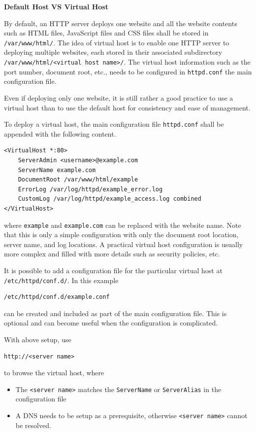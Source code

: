 \begin{mdframed}
	\noindent \textbf{Default Host VS Virtual Host}
	
	By default, an HTTP server deploys one website and all the website contents such as HTML files, JavaScript files and CSS files shall be stored in \verb|/var/www/html/|. The idea of virtual host is to enable one HTTP server to deploying multiple websites, each stored in their associated subdirectory \verb|/var/www/html/<virtual host name>/|. The virtual host information such as the port number, document root, etc., needs to be configured in \verb|httpd.conf| the main configuration file.
	
	Even if deploying only one website, it is still rather a good practice to use a virtual host than to use the default host for consistency and ease of management.
\end{mdframed}

To deploy a virtual host, the main configuration file \verb|httpd.conf| shall be appended with the following content.
\begin{lstlisting}
<VirtualHost *:80>
	ServerAdmin <username>@example.com
	ServerName example.com
	DocumentRoot /var/www/html/example
	ErrorLog /var/log/httpd/example_error.log
	CustomLog /var/log/httpd/example_access.log combined
</VirtualHost>
\end{lstlisting}
where \verb|example| and \verb|example.com| can be replaced with the website name. Note that this is only a simple configuration with only the document root location, server name, and log locations. A practical virtual host configuration is usually more complex and filled with more details such as security policies, etc.

It is possible to add a configuration file for the particular virtual host at \verb|/etc/httpd/conf.d/|. In this example
\begin{lstlisting}
/etc/httpd/conf.d/example.conf
\end{lstlisting}
can be created and included as part of the main configuration file. This is optional and can become useful when the configuration is complicated.

With above setup, use
\begin{lstlisting}
http://<server name>
\end{lstlisting}
to browse the virtual host, where
\begin{itemize}
	\item The \verb|<server name>| matches the \verb|ServerName| or \verb|ServerAlias| in the configuration file
	\item A DNS needs to be setup as a prerequisite, otherwise \verb|<server name>| cannot be resolved.
\end{itemize}

